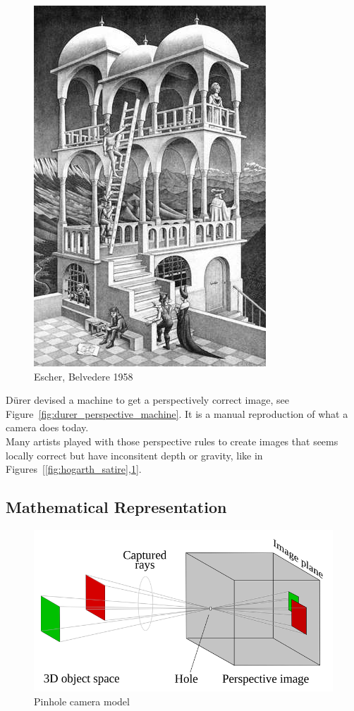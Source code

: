 \begin{figure}[h]
\centering
\includegraphics[width=0.5\columnwidth]{assets/img/escher_belvedere.jpg}
\caption{Escher, Belvedere 1958}%
\label{fig:escher_belvedere}
\end{figure}

D\"urer devised a machine to get a perspectively correct image,
see Figure~\ref{fig:durer_perspective_machine}.
It is a manual reproduction of what a camera does today.\\

Many artists played with those perspective rules to create images
that seems locally correct but have inconsitent depth or gravity, like
in Figures~[\ref{fig:hogarth_satire},\ref{fig:escher_belvedere}].


\subsection{Mathematical Representation}%
\label{sub:mathematical_representation}


\begin{figure}[h]
\centering
\includegraphics[width=0.5\columnwidth]{assets/img/pinhole_camera.png}
\caption{Pinhole camera model}%
\label{fig:pinhole_camera}
\end{figure}

